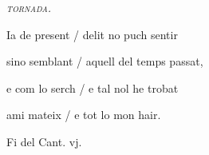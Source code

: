 \documentclass[12pt]{article}
\begin{document}
\begin{estrofaExtra}%




\begin{tornada}

\textit{\textsc{tornada.}}

\end{tornada}


\end{estrofaExtra}


\begin{estrofa}

 Ia de present / delit no puch sentir

 sino semblant / aquell del temps passat,

 e com lo serch / e tal nol he trobat

 ami mateix / e tot lo mon hair.

\end{estrofa}



\begin{estrofaExtra}%

\begin{final}

Fi del Cant. vj.

\end{final}

\end{estrofaExtra}
\end{document}

